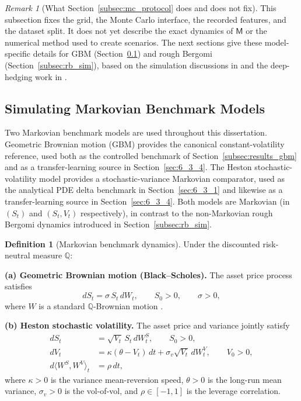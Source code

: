 \documentclass[12pt,a4paper]{article}
\theoremstyle{definition}
\newtheorem{definition}{Definition}[section]
\theoremstyle{plain}
\theoremstyle{remark}
\newtheorem{remark}{Remark}[section]
\theoremstyle{plain}
\begin{document}
\begin{remark}[What Section~\ref{subsec:mc_protocol} does and does not fix]
\label{rem:protocol_scope}
This subsection fixes the grid, the Monte Carlo interface, the recorded features, and the dataset split. 
It does not yet describe the exact dynamics of $\mathsf{M}$ or the numerical method used to create scenarios.
The next sections give these model-specific details for GBM (Section~\ref{subsec:gbm_sim}) and rough Bergomi (Section~\ref{subsec:rb_sim}), based on the simulation discussions in \cite{BayerFriz2016} and the deep-hedging work in \cite{Horvath2021DeepRough}.
\end{remark}
\newpage

\subsection{Simulating Markovian Benchmark Models}
\label{subsec:gbm_sim}

Two Markovian benchmark models are used throughout this dissertation.
Geometric Brownian motion (GBM) provides the canonical constant-volatility
reference, used both as the controlled benchmark of
Section~\ref{subsec:results_gbm} and as a transfer-learning source in
Section~\ref{sec:6_3_4}.
The Heston \cite{Heston1993} stochastic-volatility model provides a
stochastic-variance Markovian comparator, used as the analytical PDE delta
benchmark in Section~\ref{sec:6_3_1} and likewise as a transfer-learning
source in Section~\ref{sec:6_3_4}. Both models are Markovian (in $(S_t)$
and $(S_t, V_t)$ respectively), in contrast to the non-Markovian rough
Bergomi dynamics introduced in Section~\ref{subsec:rb_sim}.

\begin{definition}[Markovian benchmark dynamics]
\label{def:markovian_dynamics}
\label{def:gbm_discounted}
Under the discounted risk-neutral measure $\mathbb{Q}$:

\textbf{(a) Geometric Brownian motion (Black--Scholes).} The asset price
process satisfies
\begin{equation}\label{eq:gbm_sde}
  dS_t = \sigma\, S_t\, dW_t,
  \qquad S_0 > 0, \qquad \sigma > 0,
\end{equation}
where $W$ is a standard $\mathbb{Q}$-Brownian motion \cite{BlackScholes1973}.

\textbf{(b) Heston \cite{Heston1993} stochastic volatility.} The asset price
and variance jointly satisfy
\begin{align}
  dS_t &= \sqrt{V_t}\, S_t\, dW^S_t,
  \qquad S_0 > 0, \label{eq:heston_S}\\
  dV_t &= \kappa(\theta - V_t)\, dt + \sigma_v \sqrt{V_t}\, dW^V_t,
  \qquad V_0 > 0, \label{eq:heston_V}\\
  d\langle W^S, W^V\rangle_t &= \rho\, dt, \label{eq:heston_corr}
\end{align}
where $\kappa > 0$ is the variance mean-reversion speed, $\theta > 0$ is the
long-run mean variance, $\sigma_v > 0$ is the vol-of-vol, and
$\rho \in [-1, 1]$ is the leverage correlation.
\end{definition}
\end{document}
